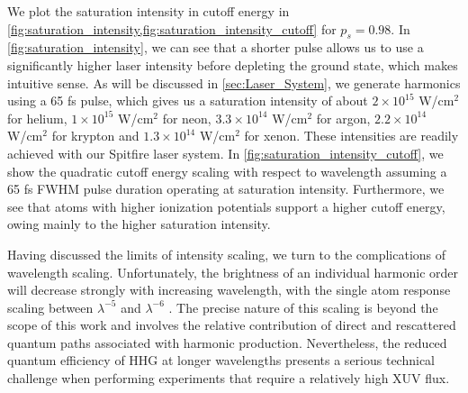 We plot the saturation intensity in cutoff energy in \cref{fig:saturation_intensity,fig:saturation_intensity_cutoff} for $p_s = 0.98$. In \cref{fig:saturation_intensity}, we can see that a shorter pulse allows us to use a significantly higher laser intensity before depleting the ground state, which makes intuitive sense. As will be discussed in \cref{sec:Laser_System}, we generate harmonics using a 65 fs pulse, which gives us a saturation intensity of about $2\times10^{15}$ W/cm$^2$ for helium, $1\times10^{15}$ W/cm$^2$ for neon, $3.3\times10^{14}$ W/cm$^2$ for argon, $2.2\times10^{14}$ W/cm$^2$ for krypton and $1.3\times10^{14}$ W/cm$^2$ for xenon. These intensities are readily achieved with our Spitfire laser system. In \cref{fig:saturation_intensity_cutoff}, we show the quadratic cutoff energy scaling with respect to wavelength assuming a 65 fs FWHM pulse duration operating at saturation intensity. Furthermore, we see that atoms with higher ionization potentials support a higher cutoff energy, owing mainly to the higher saturation intensity.

Having discussed the limits of intensity scaling, we turn to the complications of wavelength scaling. Unfortunately, the brightness of an individual harmonic order will decrease strongly with increasing wavelength, with the single atom response scaling between $\lambda^{-5}$ and $\lambda^{-6}$ \cite{tateScalingWavePacketDynamics2007,shinerWavelengthScalingHigh2009,colosimoScalingStrongfieldInteractions2008}. The precise nature of this scaling is beyond the scope of this work and involves the relative contribution of direct and rescattered quantum paths associated with harmonic production. Nevertheless, the reduced quantum efficiency of HHG at longer wavelengths presents a serious technical challenge when performing experiments that require a relatively high XUV flux.

